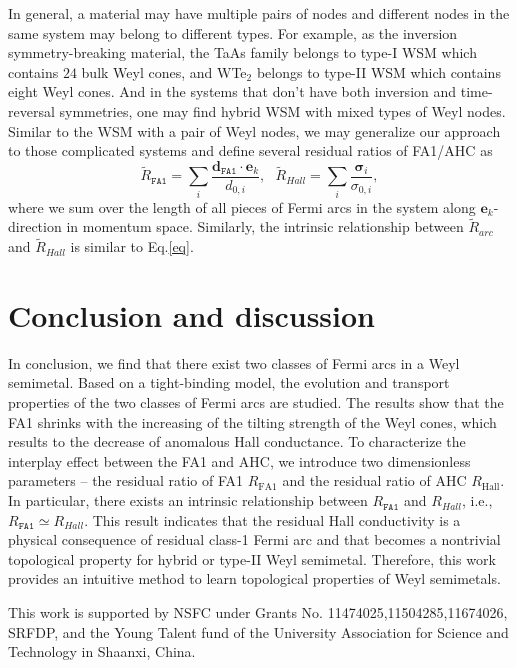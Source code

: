 \documentclass[twocolumn,superscriptaddress]{revtex4}%
\begin{document}
In general, a material may have multiple pairs of nodes and different nodes
in the same system may belong to different types. For example, as the
inversion symmetry-breaking material, the TaAs family belongs to type-I WSM
which contains $24$ bulk Weyl cones, and WTe$_{2}$ belongs to type-II WSM
which contains eight Weyl cones. And in the systems that don't have both
inversion and time-reversal symmetries, one may find hybrid WSM with mixed
types of Weyl nodes. Similar to the WSM with a pair of Weyl nodes, we may
generalize our approach to those complicated systems and define several
residual ratios of FA1/AHC as
\begin{equation}
\widetilde{R}_{\mathtt{FA1}}=\sum_{i}\frac{\mathbf{d}_{\mathtt{FA1}}%
\cdot \mathbf{e}_{k}}{d_{0,i}},\text{ \ }\widetilde{R}_{Hall}=\sum_{i}%
\frac{\mathbf{\sigma}_{i}}{\sigma_{0,i}},
\end{equation}
where we sum over the length of all pieces of Fermi arcs in the system along
$\mathbf{e}_{k}$-direction in momentum space. Similarly, the intrinsic
relationship between $\widetilde{R}_{arc}$ and $\widetilde{R}_{Hall}$ is
similar to Eq.\ref{eq}.

\section{Conclusion and discussion} \label{sec5}
In conclusion, we find that there exist
two classes of Fermi arcs in a Weyl semimetal. Based on a tight-binding model,
the evolution and transport properties of the two classes of Fermi arcs are
studied. The results show that the FA1 shrinks with the
increasing of the tilting strength of the Weyl cones, which results to the
decrease of anomalous Hall conductance. To characterize the interplay effect
between the FA1 and AHC, we introduce two
dimensionless parameters -- the residual ratio of FA1
$R_{\mathrm{FA1}}$ and the residual ratio of AHC
$R_{\mathrm{Hall}}$. In particular, there exists an intrinsic relationship
between $R_{\mathtt{FA1}}$ and $R_{Hall}$, i.e., $R_{\mathtt{FA1}}\simeq
R_{Hall}.$ This result indicates that the residual Hall conductivity is a
physical consequence of residual class-1 Fermi arc and that becomes a nontrivial
topological property for hybrid or type-II Weyl semimetal. Therefore, this
work provides an intuitive method to learn topological properties of Weyl semimetals.

\acknowledgments
This work is supported by NSFC under Grants No. 11474025,11504285,11674026,
SRFDP, and the Young Talent fund of the University Association for Science and
Technology in Shaanxi, China.
\end{document}
